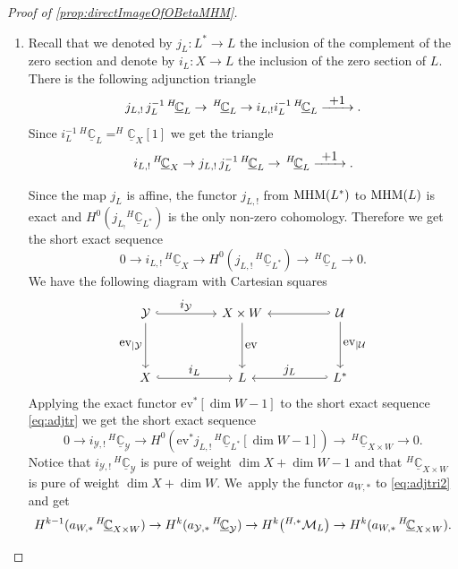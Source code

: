 \documentclass[JEP,XML,SOM,Unicode,published]{cedram}
\let\mathds\mathbb
\let\ts\textstyle
\newcommand{\To}[1]{\mathchoice{\xrightarrow{\textstyle\kern4pt#1\kern3pt}}{\xrightarrow{\,#1\,}}{}{}}
\let\ra\rightarrow
\newcommand{\ev}{\mathrm{ev}}
\newcommand{\dC}{{\mathds C}}\let\C\dC
\newcommand{\dZ}{{\mathds Z}}\let\mbz\dZ\let\Z\dZ
\newcommand{\cM}{\mathcal{M}}
\newcommand{\cU}{\mathcal{U}}\let\mcu\cU
\newcommand{\cY}{\mathcal{Y}}\let\mcy\cY
\newcommand{\MHM}{\textup{MHM}}
\let\originalleft\left
\let\originalright\right
\renewcommand{\left}{\mathopen{}\mathclose\bgroup\originalleft}
\renewcommand{\right}{\aftergroup\egroup\originalright}
\begin{document}
\begin{proof}[Proof of \cref{prop:directImageOfOBetaMHM}]
\begin{enumerate}
Moreover, under the assumption that $\beta\notin \dZ$, we~have seen in \cref{cor:FLofOBetaIsMHM} that $j_{L,!}\, ^{H\!}\underline{\dC}^{-\beta}_{L^*}$ is pure (of weight $\dim(X)+1$). Since the morphism $\ev$ is smooth, and since~$a_W$ is projective here, the second assertion thus follows from \cite[Th.\,1]{Saito1}.

\item Recall that we denoted by $j_L \colon L^* \ra L$ the inclusion of the complement of the zero section and denote by $i_L \colon X \ra L$ the inclusion of the zero section of $L$. There is the following adjunction triangle
\[
j_{L,!} \,j_L^{-1} \, ^{H\!}\underline{\dC}_{L}\to \, ^{H\!}\underline{\dC}_{L} \to i_{L,!} i^{-1}_L \, ^{H\!}\underline{\dC}_{L} \To{+1}.
\]
Since $i^{-1}_L \, ^{H\!}\underline{\dC}_{L} = ^{H\!}\underline{\dC}_{X}[1]$ we get the triangle
\[
i_{L,!} \, ^{H\!}\underline{\dC}_{X} \to j_{L,!} \,j_L^{-1} \, ^{H\!}\underline{\dC}_{L}\to \, ^{H\!}\underline{\dC}_{L} \To{+1}.
\]

Since the map $j_L$ is affine, the functor $j_{L,!}$ from $\MHM(L^*)$ to $\MHM(L)$ is exact and $H^0(j_{L_!} {^{H\!}}\underline{\dC}_{L^*})$ is the only non-zero cohomology. Therefore we get the short exact sequence
\begin{equation}
\label{eq:adjtr}
0 \to i_{L,!} \, ^{H\!}\underline{\dC}_{X} \to H^0(j_{L,!} \, ^{H\!}\underline{\dC}_{L^*})\to \, ^{H\!}\underline{\dC}_{L} \to 0.
\end{equation}
We have the following diagram with Cartesian squares
\[
\begin{tikzcd}
\mcy \arrow[rr, "\ts i_{\mcy}", hook] \arrow[dd, "\ts \ev_{|\cY}", swap] && X \times W \arrow[dd, "\ts \ev"] && \mcu \arrow[ll, hook'] \arrow[dd, "\ts \ev_{|\cU}"] \\ \\
X \arrow[rr, "\ts i_L", hook] && L && L^* \arrow[ll, "\ts j_L", hook', swap]
\end{tikzcd}
\]
Applying the exact functor $\ev^*[\dim W -1]$ to the short exact sequence \eqref{eq:adjtr} we get the short exact sequence
\begin{equation}\label{eq:adjtri2}
0 \to i_{\mcy,!} \, ^{H\!}\underline{\dC}_{\mcy} \to H^0(\ev^* j_{L,!} \, ^{H\!}\underline{\dC}_{L^*}[\dim W -1])\to \, ^{H\!}\underline{\dC}_{X \times W} \to 0.
\end{equation}
Notice that $i_{\mcy,!} \, ^{H\!}\underline{\dC}_{\mcy}$ is pure of weight $\dim X + \dim W -1$ and that $^{H\!}\underline{\dC}_{X \times W}$ is pure of weight $\dim X + \dim W$. We~apply the functor $a_{W,*}$ to \eqref{eq:adjtri2} and get
\begin{equation}\label{eq:4termseq}
H^{k-1}(a_{W,*}\, ^{H\!}\underline{\dC}_{X \times W}) \ra H^k(a_{\mcy,*} \, ^{H\!}\underline{\dC}_{\mcy}) \ra H^{k} \left({^{H,*}}\cM_L\right) \ra H^k(a_{W,*}\, ^{H\!}\underline{\dC}_{X \times W}).
\end{equation}


\end{enumerate}
\end{proof}
\end{document}
